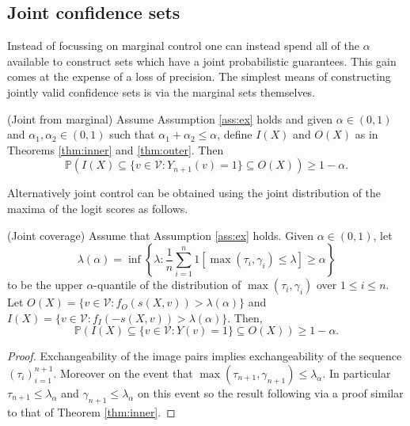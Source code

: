 \subsection{Joint confidence sets}\label{SS:joint}
Instead of focussing on marginal control one can instead spend all of the $\alpha$ available to construct sets which have a joint probabilistic guarantees. This gain comes at the expense of a loss of precision. The simplest means of constructing jointly valid confidence sets is via the marginal sets themselves.
\begin{corollary}\label{cor:weighting}
	(Joint from marginal) Assume Assumption \ref{ass:ex} holds and given $\alpha \in (0,1)$ and $\alpha_1, \alpha_2 \in (0,1)$ such that $\alpha_1 + \alpha_2 \leq \alpha$, define $I(X)$ and  $O(X)$ as in Theorems \ref{thm:inner} and \ref{thm:outer}. Then 
	\begin{equation}
		\mathbb{P}\left( I(X) \subseteq \lbrace v\in \mathcal{V}: Y_{n+1}(v) = 1 \rbrace \subseteq O(X)  \right) \geq 1 - \alpha. 
	\end{equation}
\end{corollary}
Alternatively joint control can be obtained using the joint distribution of the maxima of the logit scores as follows.
\begin{theorem}\label{thm:joint}
	(Joint coverage) Assume that Assumption \ref{ass:ex} holds. Given $\alpha \in (0,1)$, let 
	\begin{equation*}
		\lambda(\alpha) = \inf\left\lbrace \lambda: \frac{1}{n} \sum_{i = 1}^n 1\left[ \max(\tau_i, \gamma_i) \leq \lambda \right] \geq \alpha \right\rbrace
	\end{equation*}
	to be the upper $\alpha$-quantile of the distribution of $\max(\tau_i, \gamma_i)$ over $1 \leq i \leq n$. Let $O(X) = \lbrace v \in \mathcal{V}: f_O(s(X,v)) >  \lambda(\alpha) \rbrace $ and $I(X) = \lbrace v \in \mathcal{V}: f_I(-s(X,v)) >	\lambda(\alpha) \rbrace $. Then,
\begin{equation}\label{eq:probstat}
	\mathbb{P}\left( I(X) \subseteq \lbrace v\in \mathcal{V}: Y(v) = 1 \rbrace \subseteq O(X) \right) \geq 1 - \alpha.
\end{equation}
\end{theorem}
\begin{proof}
	Exchangeability of the image pairs implies exchangeability of the sequence $(\tau_i)_{i = 1}^{n+1}$. Moreover on the event that $\max(\tau_{n+1}, \gamma_{n+1}) \leq \lambda_{\alpha}$. In particular $\tau_{n+1} \leq \lambda_\alpha$ and $\gamma_{n+1} \leq \lambda_\alpha$ on this event so the result following via a proof similar to that of Theorem \ref{thm:inner}.
\end{proof}

